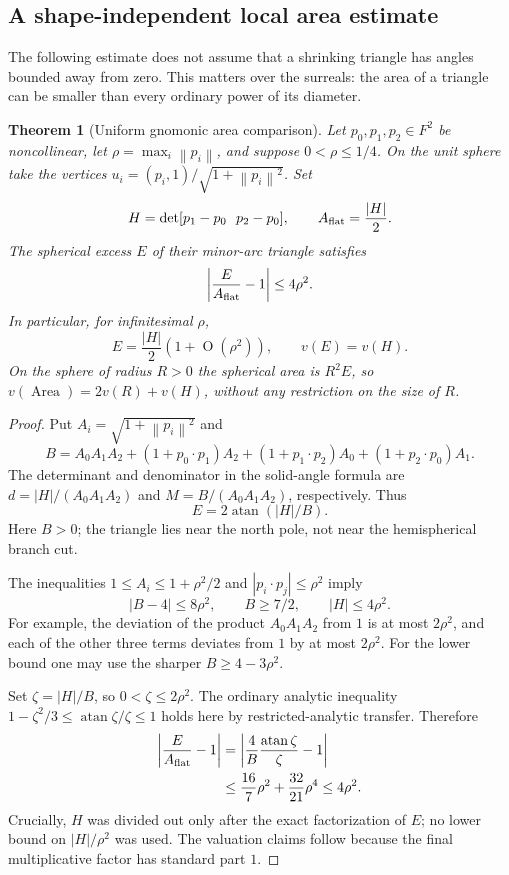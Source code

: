\documentclass[11pt,letterpaper]{article}
\numberwithin{equation}{section}
\newtheorem{theorem}{Theorem}[section]
\theoremstyle{definition}
\theoremstyle{remark}
\newcommand{\atan}{\operatorname{atan}}
\newcommand{\area}{\operatorname{Area}}
\newcommand{\norm}[1]{\left\lVert#1\right\rVert}
\newcommand{\smallO}{\operatorname{O}}
\begin{document}
\subsection{A shape-independent local area estimate}\label{e3:subsec:local-area}

The following estimate does not assume that a shrinking triangle has
angles bounded away from zero. This matters over the surreals: the area
of a triangle can be smaller than every ordinary power of its diameter.

\begin{theorem}[Uniform gnomonic area comparison]\label{e3:thm:local-area}
Let $p_0,p_1,p_2\in F^2$ be noncollinear, let
$\rho=\max_i\norm{p_i}$, and suppose $0<\rho\le1/4$. On the unit
sphere take the vertices $u_i=(p_i,1)/\sqrt{1+\norm{p_i}^2}$.
Set
\[
 H=\det[p_1-p_0\ \ p_2-p_0],\qquad A_{\rm flat}=\frac{|H|}{2}.
\]
The spherical excess $E$ of their minor-arc triangle satisfies
\begin{equation}\label{e3:eq:local-area-bound}
 \left|\frac{E}{A_{\rm flat}}-1\right|\le4\rho^2.
\end{equation}
In particular, for infinitesimal $\rho$,
\[
 E=\frac{|H|}{2}(1+\smallO(\rho^2)),\qquad
 v(E)=v(H).
\]
On the sphere of radius $R>0$ the spherical area is $R^2E$, so
$v(\area)=2v(R)+v(H)$, without any restriction on the size of $R$.
\end{theorem}

\begin{proof}
Put $A_i=\sqrt{1+\norm{p_i}^2}$ and
\[
 B=A_0A_1A_2+(1+p_0\cdot p_1)A_2
 +(1+p_1\cdot p_2)A_0+(1+p_2\cdot p_0)A_1.
\]
The determinant and denominator in the solid-angle formula are
$d=|H|/(A_0A_1A_2)$ and $M=B/(A_0A_1A_2)$, respectively. Thus
\begin{equation}\label{e3:eq:gnomonic-exact-area}
 E=2\atan(|H|/B).
\end{equation}
Here $B>0$; the triangle lies near the north pole, not near the
hemispherical branch cut.

The inequalities $1\le A_i\le1+\rho^2/2$ and
$|p_i\cdot p_j|\le\rho^2$ imply
\[
 |B-4|\le8\rho^2,\qquad B\ge7/2,\qquad |H|\le4\rho^2.
\]
For example, the deviation of the product $A_0A_1A_2$ from $1$ is at
most $2\rho^2$, and each of the other three terms deviates from $1$
by at most $2\rho^2$. For the lower bound one may use the sharper
$B\ge4-3\rho^2$.

Set $\zeta=|H|/B$, so $0<\zeta\le2\rho^2$. The ordinary analytic
inequality $1-\zeta^2/3\le\atan\zeta/\zeta\le1$ holds here by
restricted-analytic transfer. Therefore
\[
 \begin{split}
 \left|\frac{E}{A_{\rm flat}}-1\right|
 &=\left|\frac4B\frac{\atan\zeta}{\zeta}-1\right|\\
 &\le\frac{16}{7}\rho^2+\frac{32}{21}\rho^4
 \le4\rho^2.
 \end{split}
\]
Crucially, $H$ was divided out only after the exact factorization of
$E$; no lower bound on $|H|/\rho^2$ was used. The valuation claims
follow because the final multiplicative factor has standard part $1$.
\end{proof}
\end{document}
